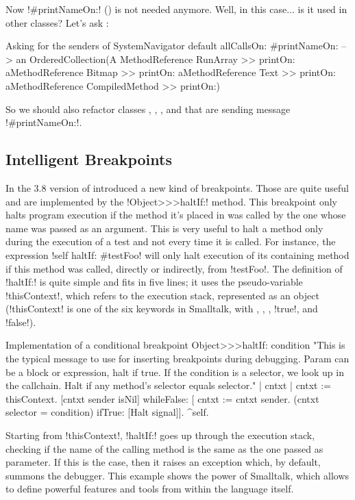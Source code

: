 \documentclass[a4paper,10pt,twoside]{book}
\begin{document}
Now \ct!#printNameOn:! () is not needed anymore. Well, in this case... is it used in other classes? Let's ask \sq:
\begin{example}[sendersofprintnameon]{Asking for the senders of }{}
SystemNavigator default allCallsOn: #printNameOn:
--> an OrderedCollection(A MethodReference RunArray >> printOn: aMethodReference Bitmap >> printOn: aMethodReference Text >> printOn: aMethodReference CompiledMethod >> printOn:)
\end{example}

So we should also refactor classes , , , and  that are sending message \ct!#printNameOn:!.


\subsection{Intelligent Breakpoints}

In the 3.8 version of \sq introduced a new kind of breakpoints.
Those are quite useful and are implemented by the \ct!Object>>>haltIf:! method.
This breakpoint only halts program execution if the method it's placed in was called by the one whose name was passed as an argument.
This is very useful to halt a method only during the execution of a test and not every time it is called.
For instance, the expression \ct!self haltIf: #testFoo! will only halt execution of its containing method if this method was called, directly or indirectly, from \ct!testFoo!.
The definition of \ct!haltIf:! is quite simple and fits in five lines; it uses the pseudo-variable \ct!thisContext!, which refers to the execution stack, represented as an object (\ct!thisContext! is one of the six keywords in Smalltalk, with \self, \super, \nil, \ct!true!, and \ct!false!).

\begin{method}[objecthaltif]{Implementation of a conditional breakpoint}
Object>>>haltIf: condition
	"This is the typical message to use for inserting breakpoints during debugging. Param can be a block or expression, halt if true.
	If the condition is a selector, we look up in the callchain. Halt if any method's selector equals selector."
	| cntxt |
	cntxt := thisContext.
	[cntxt sender isNil] whileFalse: [
		cntxt := cntxt sender.
		(cntxt selector = condition) ifTrue: [Halt signal]].
	^self.
\end{method}

Starting from \ct!thisContext!, \ct!haltIf:! goes up through the execution stack, checking if the name of the calling method is the same as the one passed as parameter.
If this is the case, then it raises an exception which, by default, summons the debugger.
This example shows the power of Smalltalk, which allows to define powerful features and tools from within the language itself.
\end{document}
